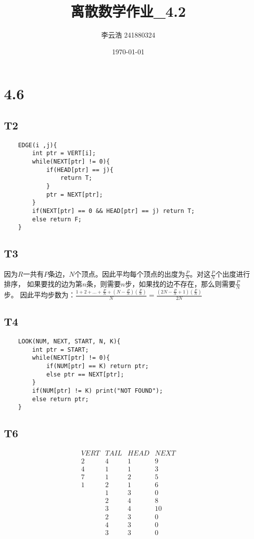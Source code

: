 \documentclass{article}
\title{离散数学作业\_4.2}
\author{李云浩 241880324}
\date{\today}
\begin{document}
\maketitle
\section{4.6}
\subsection{T2}
\begin{lstlisting}
    EDGE(i ,j){
        int ptr = VERT[i];
        while(NEXT[ptr] != 0){
            if(HEAD[ptr] == j){
                return T;
            }
            ptr = NEXT[ptr];
        }
        if(NEXT[ptr] == 0 && HEAD[ptr] == j) return T;
        else return F;
    }
\end{lstlisting}
\subsection{T3}
因为$R$一共有$P$条边，$N$个顶点。因此平均每个顶点的出度为$\frac{P}{N}$。对这$\frac{P}{N}$个出度进行排序，
如果要找的边为第$n$条，则需要$n$步，如果找的边不存在，那么则需要$\frac{P}{N}$步。
因此平均步数为：$\frac{1 + 2 + \dots + \frac{P}{N} + (N - \frac{P}{N})(\frac{P}{N})}{N} = \frac{(2N - \frac{P}{N} + 1)(\frac{P}{N})}{2N}$
\subsection{T4}
\begin{lstlisting}
    LOOK(NUM, NEXT, START, N, K){
        int ptr = START;
        while(NEXT[ptr] != 0){
            if(NUM[ptr] == K) return ptr;
            else ptr == NEXT[ptr];
        }
        if(NUM[ptr] != K) print("NOT FOUND");
        else return ptr;
    }
\end{lstlisting}
\subsection{T6}
$$
\begin{array}{|c|c|c|c|}
    VERT & TAIL & HEAD & NEXT\\
    \hline
    2 & 4 & 1 & 9\\
    4 & 1 & 1 & 3 \\
    7 & 1 & 2 & 5\\
    1 & 2 & 1 & 6\\
    \  & 1 & 3 & 0\\
    \  & 2 & 4 & 8\\
    \  & 3 & 4 & 10\\
    \  & 2 & 3 & 0\\
    \  & 4 & 3 & 0\\
    \  & 3 & 3 & 0
\end{array}
$$
\end{document}

